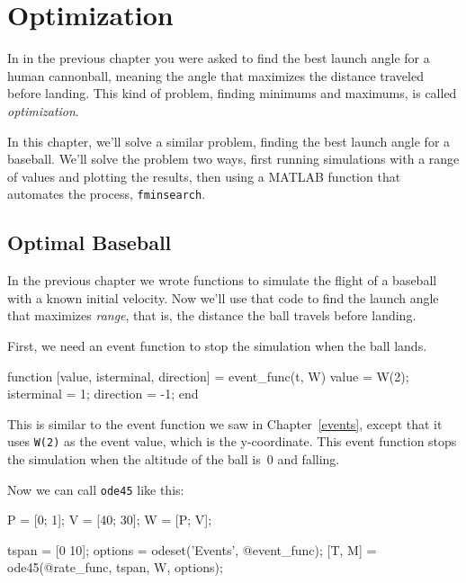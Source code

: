\chapter{Optimization}


In  in the previous chapter you were asked to find the best launch angle for a human cannonball, meaning the angle that maximizes the distance traveled before landing.  This kind of problem, finding minimums and maximums, is called \emph{optimization}.

In this chapter, we'll solve a similar problem, finding the best launch angle for a baseball.
We'll solve the problem two ways, first running simulations with a range of values and plotting the results, then using a MATLAB function that automates the process, \lstinline{fminsearch}.

\section{Optimal Baseball}

In the previous chapter we wrote functions to simulate the flight of a baseball with a known initial velocity.  Now we'll use that code to find the launch angle that maximizes \emph{range}, that is, the distance the ball travels before landing.


First, we need an event function to stop the simulation when the ball lands.

\begin{code}
function [value, isterminal, direction] = event_func(t, W)
    value = W(2);
    isterminal = 1;
    direction = -1;
end
\end{code}


This is similar to the event function we saw in Chapter~\ref{events}, except that it uses \lstinline{W(2)} as the event value, which is the y-coordinate.  This event function stops the simulation when the altitude of the ball is~0 and falling.

Now we can call \lstinline{ode45} like this:

\begin{code}
    P = [0; 1];       %
    V = [40; 30];     %
    W = [P; V];       %

    tspan = [0 10];
    options = odeset('Events', @event_func);
    [T, M] = ode45(@rate_func, tspan, W, options);
\end{code}

